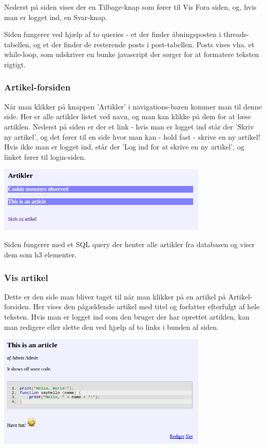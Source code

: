 \documentclass{article}
\begin{document}
Nederst på siden vises der en Tilbage-knap som fører til Vis Fora siden, og, hvis man er logget ind, en Svar-knap.

Siden fungerer ved hjælp af to queries - et der finder åbningsposten i threads-tabellen, og et der finder de resterende posts i post-tabellen. Posts vises vha. et while-loop, som udskriver en bunke javascript der sørger for at formatere teksten rigtigt.

\subsubsection{Artikel-forsiden}
Når man klikker på knappen 'Artikler' i navigations-baren kommer man til denne side. Her er alle artikler listet ved navn, og man kan klikke på dem for at læse artiklen. Nederst på siden er der et link - hvis man er logget ind står der 'Skriv ny artikel', og det fører til en side hvor man kan - hold fast - skrive en ny artikel! Hvis ikke man er logget ind, står der 'Log ind for at skrive en ny artikel', og linket fører til login-siden.

\includegraphics[width=100mm]{mi05.png}

Siden fungerer med et SQL query der henter alle artikler fra databasen og viser dem som h3 elementer.



\subsubsection{Vis artikel}
Dette er den side man bliver taget til når man klikker på en artikel på Artikel-forsiden. Her vises den pågældende artikel med titel og forfatter efterfulgt af hele teksten. Hvis man er logget ind som den bruger der har oprettet artiklen, kan man redigere eller slette den ved hjælp af to links i bunden af siden.

\includegraphics[width=100mm]{mi10.png}
\end{document}
